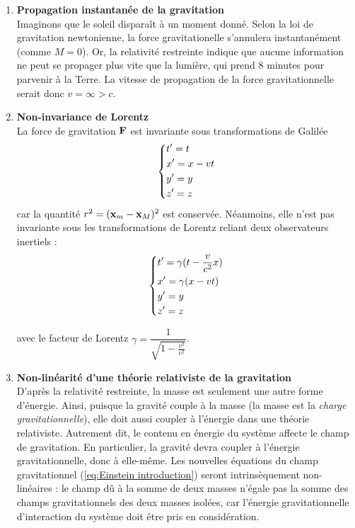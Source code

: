 \begin{enumerate}
    \item \textbf{Propagation instantanée de la gravitation} \\
    Imaginons que le soleil disparaît à un moment donné. Selon la loi de gravitation newtonienne, la force gravitationelle s'annulera instantanément (comme $M=0$). Or, la relativité restreinte indique que aucune information ne peut se propager plus vite que la lumière, qui prend 8 minutes pour parvenir à la Terre. La vitesse de propagation de la force gravitationnelle serait donc $v = \infty > c$.\\
    
    \item \textbf{Non-invariance de Lorentz}\\
    La force de gravitation $\bm{\mathrm{F}}$ est invariante sous transformations de Galilée 
    \begin{align}
        \begin{dcases}
            t' = t \\
            x' = x - vt\\
            y' = y\\
            z'=z
        \end{dcases}
    \end{align}
    car la quantité $r^2 = (\bm{\mathrm{x}}_m - \bm{\mathrm{x}}_M )^2 $ est conservée. Néanmoins, elle n'est pas invariante sous les transformations de Lorentz reliant deux observateurs inertiels :
    \begin{align}
        \begin{dcases}
            t' = \gamma(t - \frac{v}{c^2}x) \\
            x' = \gamma(x - vt)\\
            y' = y\\
            z'=z
        \end{dcases}
    \end{align}

    avec le facteur de Lorentz $\gamma = \dfrac{1}{\sqrt{1 - \frac{v^2}{c^2}}}$. \\
    
    \item \textbf{Non-linéarité d'une théorie relativiste de la gravitation}\\
    D'après la relativité restreinte, la masse est seulement une autre forme d'énergie. Ainsi, puisque la gravité couple à la masse (la masse est la \emph{charge gravitationnelle}), elle doit aussi coupler à l'énergie dans une théorie relativiste. Autrement dit, le contenu en énergie du système affecte le champ de gravitation. En particulier, la gravité devra coupler à l'énergie gravitationnelle, donc à elle-même. Les nouvelles équations du champ gravitationnel (\ref{eq:Einstein introduction}) seront intrinsèquement non-linéaires : le champ dû à la somme de deux masses n'égale pas la somme des champs gravitationnels des deux masses isolées, car l'énergie gravitationnelle d'interaction du système doit être pris en considération.
    

\end{enumerate}
